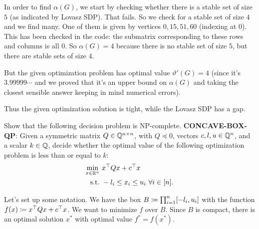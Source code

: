 \begin{enumerate}[leftmargin=*, label=(\alph*)]
In order to find $\alpha(G)$, we start by checking whether there is a stable set of size $5$ (as indicated by Lovasz SDP). That fails. So we check for a stable set of size $4$ and we find many. One of them is given by vertices $0,15,51,60$ (indexing at $0$). This has been checked in the code: the submatrix corresponding to these rows and columns is all $0$. So $\alpha(G) = 4$ because there is no stable set of size $5$, but there are stable sets of size $4$. 


But the given optimization problem has optimal value $\vartheta'(G)=4$ (since it's $3.99999\cdots$ and we proved that it's an upper bound on $\alpha(G)$ and taking the closest sensible answer keeping in mind numerical errors). 

Thus the given optimization solution is tight, while the Lovasz SDP has a gap.

{}




\end{enumerate}



\newpage
\pb

Show that the following decision problem is NP-complete. \textbf{CONCAVE-BOX-QP}: Given a symmetric matrix $Q\in \mathbb{Q}^{n\times n}$, with $Q\preceq 0$, vectors $c,l,u\in \mathbb{Q}^{n}$, and a scalar $k \in \mathbb{Q}$, decide whether the optimal value of the following optimization problem is less than or equal to $k$:
\begin{equation}\label{qnp}
\begin{aligned}
\min_{x\in\mathbb{R}^{n}}&~ x^{\top}Qx + c^{\top}x\\
\text{s.t.}&~ -l_{i}\le x_{i}\le u_{i}~\forall i\in[n].
\end{aligned}
\end{equation}

\soln


Let's set up some notation. We have the box $B \coloneqq \prod_{i=1}^{n}[-l_{i},u_{i}]$ with the function $f(x)\coloneqq x^{\top} Qx + c^{\top}x$. We want to minimize $f$ over $B$. Since $B$ is compact, there is an optimal solution $x^{*}$ with optimal value $f^{*}=f(x^{*})$.

